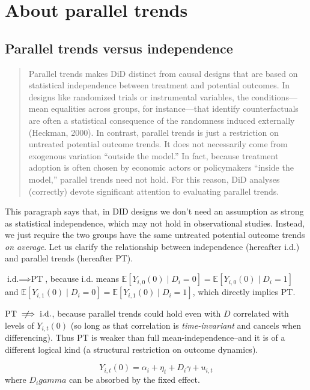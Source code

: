 \documentclass[../didNotes.tex]{subfiles}
\begin{document}
\section{About parallel trends}

\subsection{Parallel trends versus independence}

\begin{quote}
  Parallel trends makes DiD distinct from causal designs that are based on statistical
  independence between treatment
  and potential outcomes. In designs like randomized trials or instrumental
  variables, the conditions—mean equalities across groups, for instance—that identify
  counterfactuals
  are often a statistical consequence of the randomness induced externally (Heckman, 2000).
  In contrast, parallel trends is just a restriction on untreated potential outcome trends. It does
  not necessarily come from exogenous variation “outside the model.” In fact, because treatment
  adoption is often chosen by economic actors or policymakers “inside the model,” parallel trends
  need not hold. For this reason, DiD analyses (correctly) devote significant attention
  to evaluating
  parallel trends.
\end{quote}

This paragraph says that, in DID designs we don't need an assumption as strong as
statistical independence, which
may not hold in observational studies. Instead, we just require the two groups have the
same untreated potential
outcome trends \textit{on average}. Let us clarify the relationship between independence
(hereafter i.d.) and
parallel trends (hereafter PT).

$\text{i.d.} \implies \text{PT}$, because i.d.
means $\mathbb{E}[Y_{i,0}(0) \mid D_{i}=0] = \mathbb{E}[Y_{i,0}(0) \mid D_{i}=1]$
and $\mathbb{E}[Y_{i,1}(0) \mid D_{i}=0] = \mathbb{E}[Y_{i,1}(0) \mid D_{i}=1]$, which
directly implies PT.

$\text{PT} \notimplies \text{i.d.}$, because parallel trends could hold even with $D$
correlated with levels of
$Y_{i,t}(0)$ (so long as that correlation is \textit{time-invariant} and cancels when
differencing). Thus PT
is weaker than full mean-independence--and it is of a different logical kind
(a structural restriction on outcome dynamics).


$$
Y_{i,t}(0) = \alpha_{i} + \eta_{t} + D_{i} \gamma + u_{i,t}
$$
where $D_{i} gamma$ can be absorbed by the fixed effect.

\end{document}
